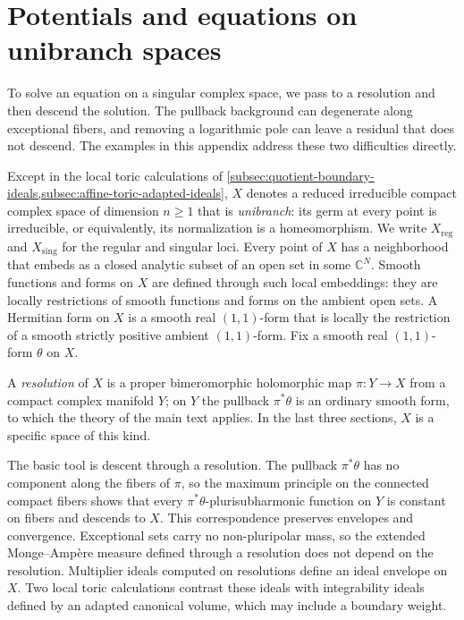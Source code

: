 \chapter{Potentials and equations on unibranch spaces}
\label{app:hermitian-spaces}
\begingroup
{}

To solve an equation on a singular complex space, we pass to a resolution and then descend the solution. The pullback background can degenerate along exceptional fibers, and removing a logarithmic pole can leave a residual that does not descend. The examples in this appendix address these two difficulties directly.

Except in the local toric calculations of \cref{subsec:quotient-boundary-ideals,subsec:affine-toric-adapted-ideals}, $X$ denotes a reduced irreducible compact complex space of dimension $n\geq1$ that is \emph{unibranch}: its germ at every point is irreducible, or equivalently, its normalization is a homeomorphism. We write $X_{\mathrm{reg}}$ and $X_{\mathrm{sing}}$ for the regular and singular loci. Every point of $X$ has a neighborhood that embeds as a closed analytic subset of an open set in some $\mathbb C^N$. Smooth functions and forms on $X$ are defined through such local embeddings: they are locally restrictions of smooth functions and forms on the ambient open sets. A Hermitian form on $X$ is a smooth real $(1,1)$-form that is locally the restriction of a smooth strictly positive ambient $(1,1)$-form. Fix a smooth real $(1,1)$-form $\theta$ on $X$.

A \emph{resolution} of $X$ is a proper bimeromorphic holomorphic map $\pi\colon Y\to X$ from a compact complex manifold $Y$; on $Y$ the pullback $\pi^*\theta$ is an ordinary smooth form, to which the theory of the main text applies. In the last three sections, $X$ is a specific space of this kind.

The basic tool is descent through a resolution. The pullback $\pi^*\theta$ has no component along the fibers of $\pi$, so the maximum principle on the connected compact fibers shows that every $\pi^*\theta$-plurisubharmonic function on $Y$ is constant on fibers and descends to $X$. This correspondence preserves envelopes and convergence. Exceptional sets carry no non-pluripolar mass, so the extended Monge--Amp\`ere measure defined through a resolution does not depend on the resolution. Multiplier ideals computed on resolutions define an ideal envelope on $X$. Two local toric calculations contrast these ideals with integrability ideals defined by an adapted canonical volume, which may include a boundary weight.

